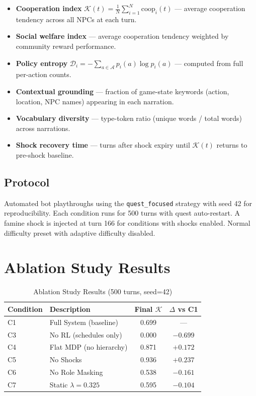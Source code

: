 \documentclass[12pt, a4paper, oneside]{report}
\begin{document}
\begin{itemize}[nosep]
    \item \textbf{Cooperation index} $\mathcal{K}(t) = \frac{1}{N} \sum_{i=1}^{N} \text{coop}_i(t)$ --- average cooperation tendency across all NPCs at each turn.
    \item \textbf{Social welfare index} --- average cooperation tendency weighted by community reward performance.
    \item \textbf{Policy entropy} $\mathcal{D}_i = -\sum_{a \in \mathcal{A}} p_i(a) \log p_i(a)$ --- computed from full per-action counts.
    \item \textbf{Contextual grounding} --- fraction of game-state keywords (action, location, NPC names) appearing in each narration.
    \item \textbf{Vocabulary diversity} --- type-token ratio (unique words / total words) across narrations.
    \item \textbf{Shock recovery time} --- turns after shock expiry until $\mathcal{K}(t)$ returns to pre-shock baseline.
\end{itemize}

\subsection{Protocol}

Automated bot playthroughs using the \texttt{quest\_focused} strategy with seed 42 for reproducibility. Each condition runs for 500 turns with quest auto-restart. A famine shock is injected at turn 166 for conditions with shocks enabled. Normal difficulty preset with adaptive difficulty disabled.

\section{Ablation Study Results}
\label{sec:ablation-results}

\begin{table}[H]
\centering
\caption{Ablation Study Results (500 turns, seed=42)}
\label{tab:results}
\begin{tabular}{llcc}
\toprule
\textbf{Condition} & \textbf{Description} & \textbf{Final $\mathcal{K}$} & \textbf{$\Delta$ vs C1} \\
\midrule
C1 & Full System (baseline) & 0.699 & --- \\
C3 & No RL (schedules only) & 0.000 & $-0.699$ \\
C4 & Flat MDP (no hierarchy) & 0.871 & $+0.172$ \\
C5 & No Shocks & 0.936 & $+0.237$ \\
C6 & No Role Masking & 0.538 & $-0.161$ \\
C7 & Static $\lambda = 0.325$ & 0.595 & $-0.104$ \\
\bottomrule
\end{tabular}
\end{table}
\end{document}

